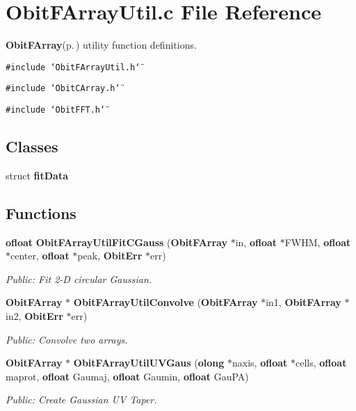 \section{Obit\-FArray\-Util.c File Reference}
\label{ObitFArrayUtil_8c}
{\bf Obit\-FArray}{\rm (p.\,\pageref{structObitFArray})} utility function definitions. 

{\tt \#include \char`\"{}Obit\-FArray\-Util.h\char`\"{}}\par
{\tt \#include \char`\"{}Obit\-CArray.h\char`\"{}}\par
{\tt \#include \char`\"{}Obit\-FFT.h\char`\"{}}\par
\subsection*{Classes}
\begin{CompactItemize}
\item 
struct {\bf fit\-Data}
\end{CompactItemize}
\subsection*{Functions}
\begin{CompactItemize}
\item 
{\bf ofloat} {\bf Obit\-FArray\-Util\-Fit\-CGauss} ({\bf Obit\-FArray} $\ast$in, {\bf ofloat} $\ast$FWHM, {\bf ofloat} $\ast$center, {\bf ofloat} $\ast$peak, {\bf Obit\-Err} $\ast$err)
\begin{CompactList}\small\item\em Public: Fit 2-D circular Gaussian. \item\end{CompactList}\item 
{\bf Obit\-FArray} $\ast$ {\bf Obit\-FArray\-Util\-Convolve} ({\bf Obit\-FArray} $\ast$in1, {\bf Obit\-FArray} $\ast$in2, {\bf Obit\-Err} $\ast$err)
\begin{CompactList}\small\item\em Public: Convolve two arrays. \item\end{CompactList}\item 
{\bf Obit\-FArray} $\ast$ {\bf Obit\-FArray\-Util\-UVGaus} ({\bf olong} $\ast$naxis, {\bf ofloat} $\ast$cells, {\bf ofloat} maprot, {\bf ofloat} Gaumaj, {\bf ofloat} Gaumin, {\bf ofloat} Gau\-PA)
\begin{CompactList}\small\item\em Public: Create Gaussian UV Taper. \item\end{CompactList}\end{CompactItemize}


